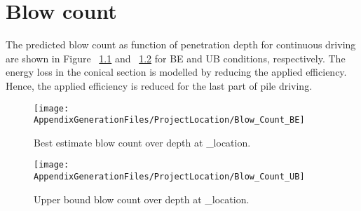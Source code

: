 \chapter{Blow count}\label{sec_1}

The predicted blow count as function of penetration depth for continuous driving
are shown in Figure ~\ref{blow_count_BE} and ~\ref{blow_count_UB} for BE and UB conditions, respectively. The energy loss in the conical section is modelled by reducing the applied efficiency. Hence, the applied efficiency is reduced for the last part of pile driving.




\begin{figure}[!htbp]
\texttt{[image: AppendixGenerationFiles/ProjectLocation/Blow\_Count\_BE]}
\caption{Best estimate blow count over depth at {\ID_location}.}
\label{blow_count_BE}\end{figure}

\newpage
\begin{figure}[!htbp]
\texttt{[image: AppendixGenerationFiles/ProjectLocation/Blow\_Count\_UB]}
\caption{Upper bound blow count over depth at {\ID_location}.}
\label{blow_count_UB}\end{figure}




